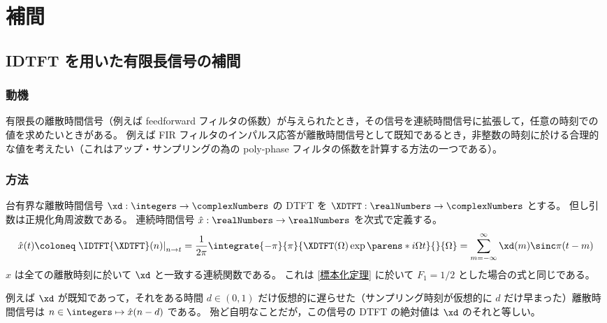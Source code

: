 \chapter{補間}
    \section{IDTFT を用いた有限長信号の補間}
        \label{IDTFT を用いた有限長信号の補間}
        \subsection{動機}
            有限長の離散時間信号（例えば feedforward フィルタの係数）が与えられたとき，その信号を連続時間信号に拡張して，任意の時刻での値を求めたいときがある。
            例えば FIR フィルタのインパルス応答が離散時間信号として既知であるとき，非整数の時刻に於ける合理的な値を考えたい（これはアップ・サンプリングの為の poly-phase フィルタの係数を計算する方法の一つである）。
        \subsection{方法}
            \label{IDTFT を用いた有限長信号の補間>方法}
            台有界な離散時間信号 $\xd:\integers\to\complexNumbers$ の DTFT を $\XDTFT:\realNumbers\to\complexNumbers$ とする。
            但し引数は正規化角周波数である。
            連続時間信号 $\hat{x}:\realNumbers\to\realNumbers$ を次式で定義する。
            \[ \hat{x}(t)\coloneq\left.\IDTFT{\XDTFT}(n)\right|_{n\to t} = \frac{1}{2\pi}\integrate{-\pi}{\pi}{\XDTFT(\Omega)\exp\parens*{i\Omega t}}{}{\Omega} = \sum_{m=-\infty}^\infty \xd(m)\sinc\pi(t-m) \]
            $\hat{x}$ は全ての離散時刻に於いて $\xd$ と一致する連続関数である。
            これは \ref{標本化定理} に於いて $F_1=1/2$ とした場合の式と同じである。
            \par
            例えば $\xd$ が既知であって，それをある時間 $d\in(0,1)$ だけ仮想的に遅らせた（サンプリング時刻が仮想的に $d$ だけ早まった）離散時間信号は $n\in\integers\mapsto\hat{x}(n-d)$ である。
            殆ど自明なことだが，この信号の DTFT の絶対値は $\xd$ のそれと等しい。
